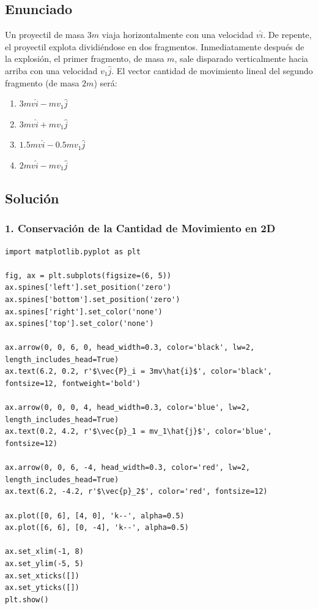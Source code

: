 \documentclass[12pt, a4paper]{article}
\begin{document}
\newpage

\subsection*{Enunciado}
Un proyectil de masa $3m$ viaja horizontalmente con una velocidad $v\hat{i}$. De repente, el proyectil explota dividiéndose en dos fragmentos. Inmediatamente después de la explosión, el primer fragmento, de masa $m$, sale disparado verticalmente hacia arriba con una velocidad $v_1\hat{j}$. El vector cantidad de movimiento lineal del segundo fragmento (de masa $2m$) será:
\begin{enumerate}[label=\alph*)]
    \item $3mv\hat{i} - mv_1\hat{j}$
    \item $3mv\hat{i} + mv_1\hat{j}$
    \item $1.5mv\hat{i} - 0.5mv_1\hat{j}$
    \item $2mv\hat{i} - mv_1\hat{j}$
\end{enumerate}

\subsection*{Solución}

\subsubsection*{1. Conservación de la Cantidad de Movimiento en 2D}

\begin{verbatim}
import matplotlib.pyplot as plt

fig, ax = plt.subplots(figsize=(6, 5))
ax.spines['left'].set_position('zero')
ax.spines['bottom'].set_position('zero')
ax.spines['right'].set_color('none')
ax.spines['top'].set_color('none')

ax.arrow(0, 0, 6, 0, head_width=0.3, color='black', lw=2, length_includes_head=True)
ax.text(6.2, 0.2, r'$\vec{P}_i = 3mv\hat{i}$', color='black', fontsize=12, fontweight='bold')

ax.arrow(0, 0, 0, 4, head_width=0.3, color='blue', lw=2, length_includes_head=True)
ax.text(0.2, 4.2, r'$\vec{p}_1 = mv_1\hat{j}$', color='blue', fontsize=12)

ax.arrow(0, 0, 6, -4, head_width=0.3, color='red', lw=2, length_includes_head=True)
ax.text(6.2, -4.2, r'$\vec{p}_2$', color='red', fontsize=12)

ax.plot([0, 6], [4, 0], 'k--', alpha=0.5)
ax.plot([6, 6], [0, -4], 'k--', alpha=0.5)

ax.set_xlim(-1, 8)
ax.set_ylim(-5, 5)
ax.set_xticks([])
ax.set_yticks([])
plt.show()
\end{verbatim}
\end{document}
